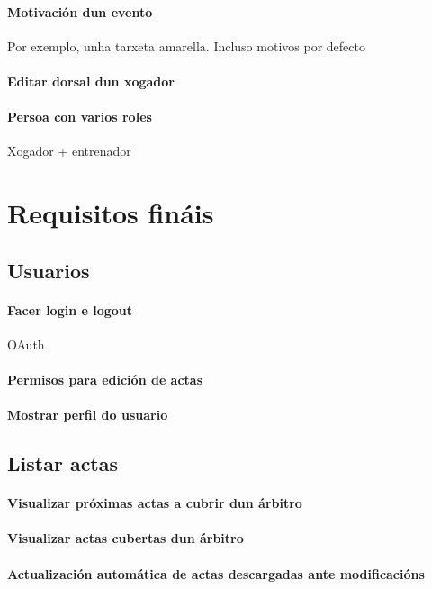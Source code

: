 \documentclass[a4paper,spanish,10p,titlepage]{report}
\begin{document}
  \paragraph{Motivación dun evento} Por exemplo, unha tarxeta amarella. Incluso motivos 
por defecto
  \paragraph{Editar dorsal dun xogador}
  \paragraph{Persoa con varios roles} Xogador + entrenador
  
  \clearpage

  \section{Requisitos fináis}

  
  \subsection{Usuarios}
    \paragraph{Facer login e logout} OAuth
    \paragraph{Permisos para edición de actas}
    \paragraph{Mostrar perfil do usuario}

  \subsection{Listar actas}
    \paragraph{Visualizar próximas actas a cubrir dun árbitro}
    \paragraph{Visualizar actas cubertas dun árbitro}
    \paragraph{Actualización automática de actas descargadas ante modificacións}
\end{document}
